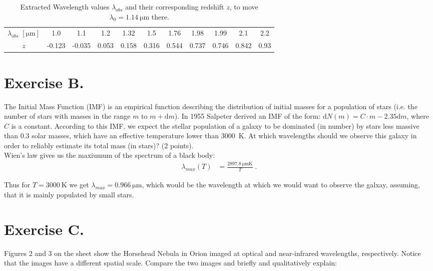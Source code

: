 \documentclass[11pt,a4paper,twoside]{article}
\begin{document}
\begin{table}[h!]
\begin{tabular}{ccccccccccc} \toprule
$\lambda_{obs}$ $[\si{\micro\meter}]$ & 1.0 & 1.1 & 1.2 & 1.32 & 1.5 & 1.76 & 1.98 & 1.99 & 2.1 & 2.2  \\
$z$ & -0.123 & -0.035 & 0.053 & 0.158 & 0.316 & 0.544 & 0.737 & 0.746 & 0.842 & 0.93  \\
\bottomrule
\end{tabular}
\caption{Extracted Wavelength values $\lambda_{obs}$ and their corresponding
         redshift $z$, to move $\lambda_0 = \SI{1.14}{\micro\meter}$ there.}
\label{tab:l}
\end{table}


\section*{Exercise B.}

The Initial Mass Function (IMF) is an empirical function describing the
distribution of initial masses for a population of stars (i.e. the number of
stars with masses in the range $m$ to $m + \mathrm{d}m$). In 1955 Salpeter
derived an IMF of the form: $\mathrm{d}N(m) = C \cdot m-2.35\mathrm{d}m$, where
$C$ is a constant. According to this IMF, we expect the stellar population of a
galaxy to be dominated (in number) by stars less massive than $0.3$ solar
masses, which have an effective temperature lower than \SI{3000}{\kelvin}. At
which wavelengths should we observe this galaxy in order to reliably estimate
its total mass (in stars)? (2 points). \\

Wien's law gives us the maxiumum of the spectrum of a black body:
\begin{align}
\lambda_{max}(T) &= \frac{\SI{2897.8}{\micro\meter\kelvin}}{T} \;.
\label{eq:w}
\end{align}

Thus for $T=\SI{3000}{\kelvin}$ we get $\lambda_{max} =
\SI{0.966}{\micro\meter}$, which would be the wavelength at which we would want
to observe the galxay, assuming, that it is mainly populated by small stars.


\section*{Exercise C.}

Figures 2 and 3 on the sheet show the Horsehead Nebula in Orion imaged at
optical and near-infrared wavelengths, respectively. Notice that the images
have a different spatial scale.  Compare the two images and briefly and
qualitatively explain: \\
\end{document}
